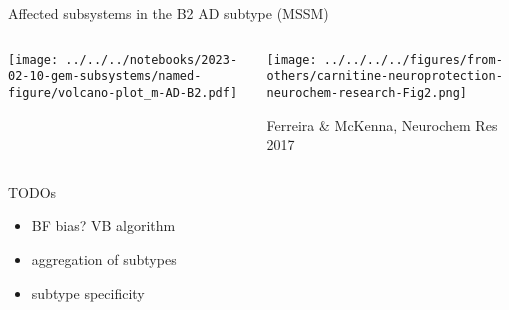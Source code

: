 \documentclass[aspectratio=169]{beamer}
\begin{document}
\begin{frame}{Affected subsystems in the B2 AD subtype (MSSM)}
\begin{columns}[t]
\begin{column}{0.5\textwidth}

\texttt{[image: ../../../notebooks/2023-02-10-gem-subsystems/named-figure/volcano-plot\_m-AD-B2.pdf]}

\end{column}

\begin{column}{0.5\textwidth}

{\tiny
  
}

\texttt{[image: ../../../../figures/from-others/carnitine-neuroprotection-neurochem-research-Fig2.png]}

{\tiny Ferreira \& McKenna, Neurochem Res 2017}
\end{column}
\end{columns}
\end{frame}

\begin{frame}{TODOs}
\begin{itemize}
  \item BF bias? VB algorithm
  \item aggregation of subtypes
  \item subtype specificity
\end{itemize}
\end{frame}
\end{document}
